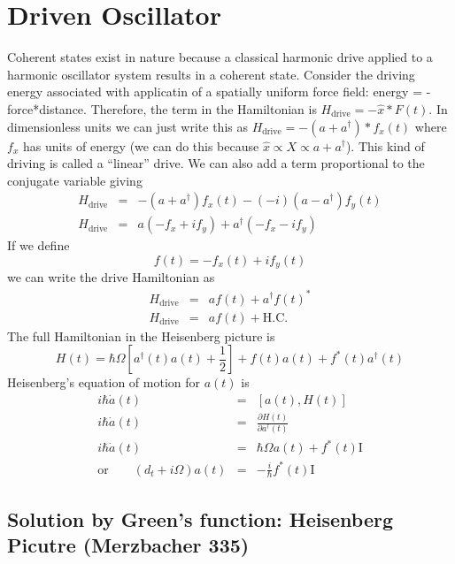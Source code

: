 \section{Driven Oscillator}

Coherent states exist in nature because a classical harmonic drive applied to a harmonic oscillator system results in a coherent state. Consider the driving energy associated with applicatin of a spatially uniform force field: energy = -force{*}distance. Therefore, the term in the Hamiltonian is $H_{\textrm{drive}}=-\hat{x}*F(t)$. In dimensionless units we can just write this as $H_{\textrm{drive}}=-(a+a^{\dagger})*f_{x}(t)$ where $f_{x}$ has units of energy (we can do this because $\hat{x}\propto X\propto a+a^{\dagger}$). This kind of driving is called a {}``linear'' drive. We can also add a term proportional to the conjugate variable giving\begin{eqnarray*}
H_{\textrm{drive}} & = & -(a+a^{\dagger})f_{x}(t)-(-i)(a-a^{\dagger})f_{y}(t)\\
H_{\textrm{drive}} & = & a(-f_{x}+if_{y})+a^{\dagger}(-f_{x}-if_{y})\end{eqnarray*}
If we define \begin{equation}
f(t)=-f_{x}(t)+if_{y}(t) \end{equation}
we can write the drive Hamiltonian as\begin{eqnarray*}
H_{\textrm{drive}} & = & af(t)+a^{\dagger}f(t)^{*}\\
H_{\textrm{drive}} & = & af(t)+\textrm{H.C.}\end{eqnarray*}
The full Hamiltonian in the Heisenberg picture is \begin{equation}
H(t)=\hbar\Omega\left[a^{\dagger}(t)a(t)+\frac{1}{2}\right]+f(t)a(t)+f^{*}(t)a^{\dagger}(t) \end{equation}
Heisenberg's equation of motion for $a(t)$ is\begin{eqnarray*}
i\hbar\dot{a}(t) & = & \left[a(t),H(t)\right]\\
i\hbar\dot{a}(t) & = & \frac{\partial H(t)}{\partial a^{\dagger}(t)}\\
i\hbar\dot{a}(t) & = & \hbar\Omega a(t)+f^{*}(t)\textrm{I}\\
\textrm{or}\qquad\left(d_{t}+i\Omega\right)a(t) & = & -\frac{i}{\hbar}f^{*}(t)\textrm{I}\end{eqnarray*}

\subsection{Solution by Green's function: Heisenberg Picutre (Merzbacher 335)}

